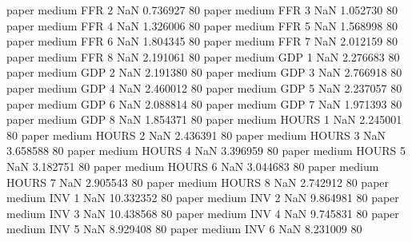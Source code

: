             paper     medium      FFR                 2                  NaN  0.736927 80
            paper     medium      FFR                 3                  NaN  1.052730 80
            paper     medium      FFR                 4                  NaN  1.326006 80
            paper     medium      FFR                 5                  NaN  1.568998 80
            paper     medium      FFR                 6                  NaN  1.804345 80
            paper     medium      FFR                 7                  NaN  2.012159 80
            paper     medium      FFR                 8                  NaN  2.191061 80
            paper     medium      GDP                 1                  NaN  2.276683 80
            paper     medium      GDP                 2                  NaN  2.191380 80
            paper     medium      GDP                 3                  NaN  2.766918 80
            paper     medium      GDP                 4                  NaN  2.460012 80
            paper     medium      GDP                 5                  NaN  2.237057 80
            paper     medium      GDP                 6                  NaN  2.088814 80
            paper     medium      GDP                 7                  NaN  1.971393 80
            paper     medium      GDP                 8                  NaN  1.854371 80
            paper     medium    HOURS                 1                  NaN  2.245001 80
            paper     medium    HOURS                 2                  NaN  2.436391 80
            paper     medium    HOURS                 3                  NaN  3.658588 80
            paper     medium    HOURS                 4                  NaN  3.396959 80
            paper     medium    HOURS                 5                  NaN  3.182751 80
            paper     medium    HOURS                 6                  NaN  3.044683 80
            paper     medium    HOURS                 7                  NaN  2.905543 80
            paper     medium    HOURS                 8                  NaN  2.742912 80
            paper     medium      INV                 1                  NaN 10.332352 80
            paper     medium      INV                 2                  NaN  9.864981 80
            paper     medium      INV                 3                  NaN 10.438568 80
            paper     medium      INV                 4                  NaN  9.745831 80
            paper     medium      INV                 5                  NaN  8.929408 80
            paper     medium      INV                 6                  NaN  8.231009 80
